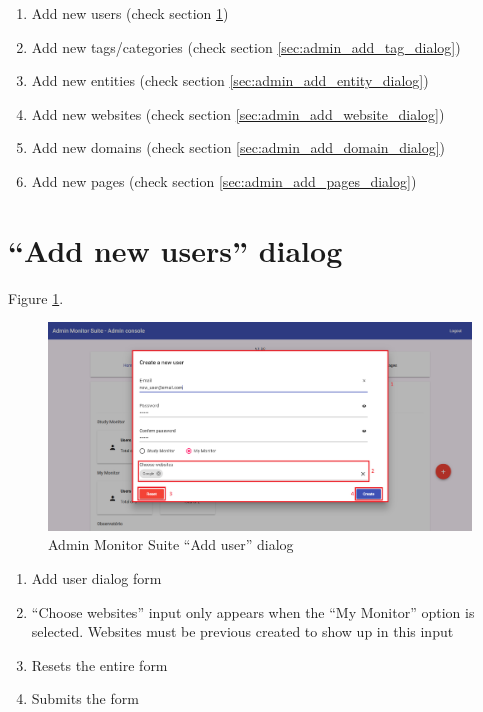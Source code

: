 \begin{enumerate}
    \item Add new users (check section \ref{sec:admin_add_users_dialog})
    \item Add new tags/categories (check section \ref{sec:admin_add_tag_dialog})
    \item Add new entities (check section \ref{sec:admin_add_entity_dialog})
    \item Add new websites (check section \ref{sec:admin_add_website_dialog})
    \item Add new domains (check section \ref{sec:admin_add_domain_dialog})
    \item Add new pages (check section \ref{sec:admin_add_pages_dialog})
\end{enumerate}

\section{``Add new users'' dialog}
\label{sec:admin_add_users_dialog}

Figure \ref{fig:admin_add_user_dialog}.

\begin{figure}[H]
    \centering
    \includegraphics[width=\linewidth]{lib/images/admin/admin_add_user_dialog.png}
    \caption{Admin Monitor Suite ``Add user'' dialog}
    \label{fig:admin_add_user_dialog}
\end{figure}

\begin{enumerate}
    \item Add user dialog form
    \item ``Choose websites'' input only appears when the ``My Monitor'' option is selected. Websites must be previous created to show up in this input
    \item Resets the entire form
    \item Submits the form
\end{enumerate}

